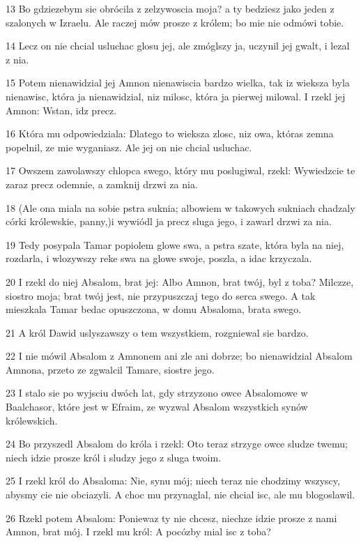 \par 13 Bo gdziezebym sie obrócila z zelzywoscia moja? a ty bedziesz jako jeden z szalonych w Izraelu. Ale raczej mów prosze z królem; bo mie nie odmówi tobie.
\par 14 Lecz on nie chcial usluchac glosu jej, ale zmóglszy ja, uczynil jej gwalt, i lezal z nia.
\par 15 Potem nienawidzial jej Amnon nienawiscia bardzo wielka, tak iz wieksza byla nienawisc, która ja nienawidzial, niz milosc, która ja pierwej milowal. I rzekl jej Amnon: Wstan, idz precz.
\par 16 Która mu odpowiedziala: Dlatego to wieksza zlosc, niz owa, któras zemna popelnil, ze mie wyganiasz. Ale jej on nie chcial usluchac.
\par 17 Owszem zawolawszy chlopca swego, który mu poslugiwal, rzekl: Wywiedzcie te zaraz precz odemnie, a zamknij drzwi za nia.
\par 18 (Ale ona miala na sobie pstra suknia; albowiem w takowych sukniach chadzaly córki królewskie, panny,)i wywiódl ja precz sluga jego, i zawarl drzwi za nia.
\par 19 Tedy posypala Tamar popiolem glowe swa, a pstra szate, która byla na niej, rozdarla, i wlozywszy reke swa na glowe swoje, poszla, a idac krzyczala.
\par 20 I rzekl do niej Absalom, brat jej: Albo Amnon, brat twój, byl z toba? Milczze, siostro moja; brat twój jest, nie przypuszczaj tego do serca swego. A tak mieszkala Tamar bedac opuszczona, w domu Absaloma, brata swego.
\par 21 A król Dawid uslyszawszy o tem wszystkiem, rozgniewal sie bardzo.
\par 22 I nie mówil Absalom z Amnonem ani zle ani dobrze; bo nienawidzial Absalom Amnona, przeto ze zgwalcil Tamare, siostre jego.
\par 23 I stalo sie po wyjsciu dwóch lat, gdy strzyzono owce Absalomowe w Baalchasor, które jest w Efraim, ze wyzwal Absalom wszystkich synów królewskich.
\par 24 Bo przyszedl Absalom do króla i rzekl: Oto teraz strzyge owce sludze twemu; niech idzie prosze król i sludzy jego z sluga twoim.
\par 25 I rzekl król do Absaloma: Nie, synu mój; niech teraz nie chodzimy wszyscy, abysmy cie nie obciazyli. A choc mu przynaglal, nie chcial isc, ale mu blogoslawil.
\par 26 Rzekl potem Absalom: Poniewaz ty nie chcesz, niechze idzie prosze z nami Amnon, brat mój. I rzekl mu król: A pocózby mial isc z toba?
